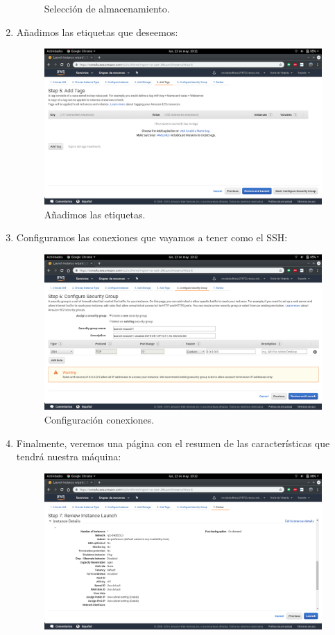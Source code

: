 \begin{enumerate}
\begin{figure}[h]
		\caption{Selección de almacenamiento.}
		\label{Selección de almacenamiento}
	\end{figure}
\newpage
	\item Añadimos las etiquetas que deseemos:
	\begin{figure}[h]
		\centering
		\includegraphics[scale=0.28]{ImagenesAWS/9.png}
		\caption{Añadimos las etiquetas.}
		\label{Añadimos las etiqutas}
	\end{figure}
	\item Configuramos las conexiones que vayamos a tener como el SSH:
	\begin{figure}[h]
		\centering
		\includegraphics[scale=0.28]{ImagenesAWS/10.png}
		\caption{Configuración conexiones.}
		\label{Configuración de conexiones}
	\end{figure}
\newpage
	\item Finalmente, veremos una página con el resumen de las características que tendrá nuestra máquina:
	\begin{figure}[h]
		\centering
		\includegraphics[scale=0.28]{ImagenesAWS/12.png}

\end{figure}
\end{enumerate}

